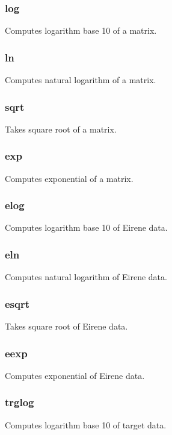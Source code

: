 \documentclass[a4paper,10pt]{report}
\begin{document}
\subsubsection{log}\label{sec:log}
Computes logarithm base 10 of a matrix.

\subsubsection{ln}\label{sec:ln}
Computes natural logarithm of a matrix.

\subsubsection{sqrt}\label{sec:sqrt}
Takes square root of a matrix.

\subsubsection{exp}\label{sec:exp}
Computes exponential of a matrix.

\subsubsection{elog}\label{sec:elog}
Computes logarithm base 10 of Eirene data.

\subsubsection{eln}\label{sec:eln}
Computes natural logarithm of Eirene data.

\subsubsection{esqrt}\label{sec:esqrt}
Takes square root of Eirene data.

\subsubsection{eexp}\label{sec:eexp}
Computes exponential of Eirene data.

\subsubsection{trglog}\label{sec:trglog}
Computes logarithm base 10 of target data.
\end{document}
